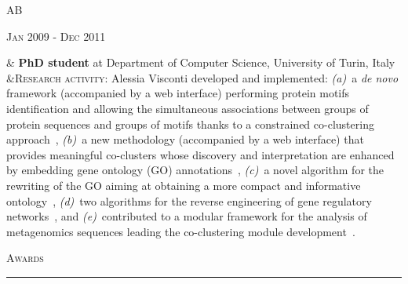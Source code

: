 \documentclass[a4paper,10pt]{article}
\newcommand{\mediumtitle}[1]{
	\vspace{0.2cm}
	{\noindent
	\Large \textsc{#1}\\[-2ex]
	\hrule
	\vspace{0.2cm}}
}
\newenvironment{doubletablelist}
{
	\vspace{-0.2cm}
	\begin{longtable}[!h]{AB}}{\end{longtable}
}
\newcommand{\dtlist}[2]{
\hspace{-3cm}
\noindent
	\begin{minipage}{0.22\textwidth}
	\begin{flushright}
	\textsc{#1}
	\end{flushright}
	\end{minipage}
	& #2\\[0.2cm]
}
\begin{document}
\begin{doubletablelist}
	\dtlist{Jan 2009 - Dec 2011}{\textbf{PhD student} at Department of Computer Science, University of Turin, Italy \\
	  &\textsc{Research activity}: Alessia Visconti developed and implemented: \emph{(a)}~a \emph{de novo} framework (accompanied by a web interface) performing protein motifs identification and allowing the simultaneous associations between groups of protein sequences and groups of motifs thanks to a constrained co-clustering approach~\cite{Cor09a}, \emph{(b)}~a new methodology (accompanied by a web interface) that provides meaningful co-clusters whose discovery and interpretation are enhanced by embedding gene ontology (GO) annotations~\cite{Vis11c,Cor09b}, \emph{(c)}~a novel algorithm for the rewriting of the GO aiming at obtaining a more compact and informative ontology~\cite{Vis11a,Vis10a}, \emph{(d)}~two algorithms for the reverse engineering of gene regulatory networks~\cite{Vis11b,Mar12,Vis12b}, and \emph{(e)}~contributed to a modular framework for the analysis of metagenomics sequences leading the co-clustering module development~\cite{Bon11}. %
	}
 \end{doubletablelist}



\mediumtitle{Awards}
\end{document}
